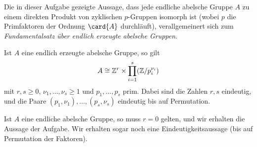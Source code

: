 \section{}





\subsection{}

Die in dieser Aufgabe gezeigte Aussage, dass jede endliche abelsche Gruppe $A$ zu einem direkten Produkt von zyklischen $p$-Gruppen isomorph ist (wobei $p$ die Primfaktoren der Ordnung $\card{A}$ durchläuft), verallgemeinert sich zum \emph{Fundamentalsatz über endlich erzeugte abelsche Gruppen}.

\begin{theorem}
  \label{theorem: fundamental theorem for finitely generated abelian groups}
  Ist $A$ eine endlich erzeugte abelsche Gruppe, so gilt
  \[
          A
    \cong \mathbb{Z}^r \times \prod_{i=1}^s (\mathbb{Z}/p_i^{\nu_i})
  \]
  mit $r, s \geq 0$, $\nu_1, \dotsc, \nu_s \geq 1$ und $p_1, \dotsc, p_s$ prim.
  Dabei sind die Zahlen $r, s$ eindeutig, und die Paare $(p_1, \nu_1), \dotsc, (p_s, \nu_s)$ eindeutig bis auf Permutation.
\end{theorem}

Ist $A$ eine endliche abelsche Gruppe, so muss $r = 0$ gelten, und wir erhalten die Aussage der Aufgabe.
Wir erhalten sogar noch eine Eindeutigkeitsaussage (bis auf Permutation der Faktoren).

